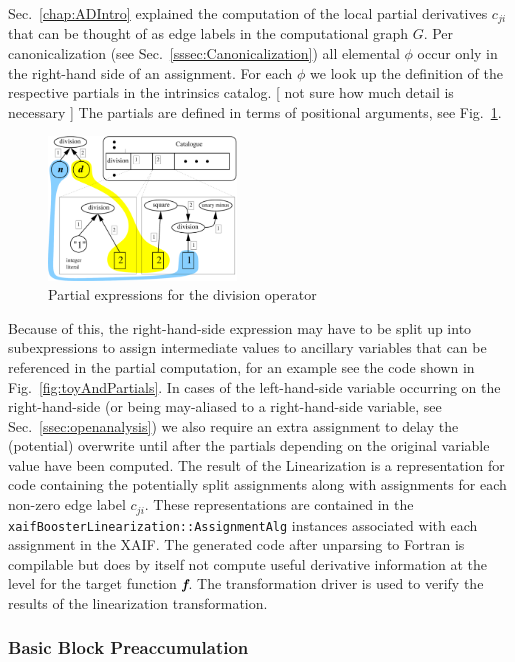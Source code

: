 \documentclass{book}
\newcommand{\xaif}{XAIF}
\newcommand{\bmf}{\mbox{\bf\em f}}
\newcommand{\code}[1]{{\small\tt{#1}}}
\newcommand{\refsec}[1]{{Sec.~\ref{#1}}}
\newcommand{\reffig}[1]{{Fig.~\ref{#1}}}
\begin{document}
\refsec{chap:ADIntro} explained the computation of 
the local partial derivatives $c_{ji}$ that can be thought of as edge labels 
in the computational graph $G$. 
Per canonicalization (see \refsec{sssec:Canonicalization}) 
all elemental $\phi$ 
occur only in the right-hand side of an assignment. 
For each $\phi$ we look up the definition of the respective partials in 
the intrinsics catalog. 
{\color{red} [ not sure  how much detail is necessary ] } 
The partials are defined in terms of positional arguments, see 
\reffig{fig:divExample}. 
\begin{figure}
  \centering \includegraphics[width=5cm]{divIntrinsic}
  \caption{Partial expressions for the division operator} \label{fig:divExample}
\end{figure}

Because of this, 
the right-hand-side expression may have to be split up into 
subexpressions to assign intermediate values to ancillary variables 
that can be referenced in the partial computation, for an example see 
the code shown in \reffig{fig:toyAndPartials}.  
In cases of the left-hand-side variable occurring on the right-hand-side 
(or being may-aliased to a right-hand-side variable, 
see \refsec{ssec:openanalysis}) we also require an extra assignment to 
delay the (potential) overwrite until after the partials depending on 
the original variable value have been computed.
The result of the Linearization is a representation for 
code containing the potentially split 
assignments along with assignments for each non-zero edge label $c_{ji}$.
These representations are contained in the \code{xaifBoosterLinearization::AssignmentAlg} instances associated with each assignment in the \xaif.
The generated code after unparsing to Fortran 
is compilable but does by itself not compute useful 
derivative information at the level for the target function $\bmf$. The 
transformation driver is 
used to verify the results of the linearization transformation.

\subsubsection{Basic Block Preaccumulation}\label{sssec:BBPreacc}
\end{document}
